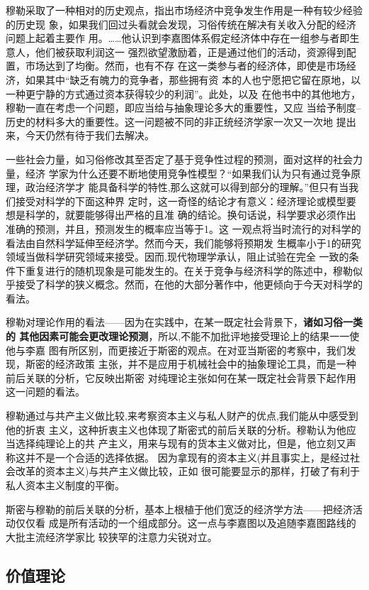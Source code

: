 穆勒采取了一种相对的历史观点，指出市场经济中竞争发生作用是一种有较少经验的历史现
象，如果我们回过头看就会发现，习俗传统在解决有关收入分配的经济问题上起着主要作
用。……他认识到李嘉图体系假定经济体中存在一组参与者即生意人，他们被获取利润这一
强烈欲望激励着，正是通过他们的活动，资源得到配置，市场达到了均衡。然而，也有不存
在这一类参与者的经济体，即使是市场经济，如果其中“缺乏有魄力的竞争者，那些拥有资
本的人也宁愿把它留在原地，以一种更宁静的方式通过资本获得较少的利润”。此处，以及
在他书中的其他地方，穆勒一直在考虑一个问题，即应当给与抽象理论多大的重要性，又应
当给予制度--历史的材料多大的重要性。这一问题被不同的非正统经济学家一次又一次地
提出来，今天仍然有待于我们去解决。

一些社会力量，如习俗修改其至否定了基于竞争性过程的预测，面对这样的社会力量，经济
学家为什么还要不断地使用竞争性模型？“如果我们认为只有通过竞争原理，政治经济学才
能具备科学的特性,那么这就可以得到部分的理解。”但只有当我们接受对科学的下面这种界
定时，这一奇怪的结论才有意义：经济理论或模型要想是科学的，就要能够得出严格的且准
确的结论。换句话说，科学要求必须作出准确的预测，并且，预测发生的概率应当等于1。这
一观点将当时流行的对科学的看法由自然科学延伸至经济学。然而今天，我们能够将预期发
生概率小于1的研究领域当做科学研究领域来接受。因而,现代物理学承认，阻止试验在完全
一致的条件下重复进行的随机现象是可能发生的。在关于竞争与经济科学的陈述中，穆勒似
乎接受了科学的狭义概念。然而，在他的大部分著作中，他更倾向于今天对科学的看法。


穆勒对理论作用的看法——因为在实践中，在某一既定社会背景下，\textbf{诸如习俗一类的
  其他因素可能会更改理论预测}，所以,不能不加批评地接受理论上的结果一一使他与李嘉
图有所区别，而更接近于斯密的观点。在对亚当斯密的考察中，我们发现，斯密的经济政策
主张，并不是应用于机械社会中的抽象理论工具，而是一种前后关联的分析，它反映出斯密
对纯理论主张如何在某一既定社会背景下起作用这一问题的看法。

穆勒通过与共产主义做比较,来考察资本主义与私人财产的优点,我们能从中感受到他的折衷
主义，这种折衷主义也体现了斯密式的前后关联的分析。穆勒认为他应当选择纯理论上的共
产主义，用来与现有的货本主义做对比，但是，他立刻又声称这并不是一个合适的选择依据。
因为拿现有的资本主义(并且事实上，是经过社会改革的资本主义)与共产主义做比较，正如
很可能要显示的那样，打破了有利于私人资本主义制度的平衡。

斯密与穆勒的前后关联的分析，基本上根植于他们宽泛的经济学方法——把经济活动仅仅看
成是所有活动的一个组成部分。这一点与李嘉图以及追随李嘉图路线的大批主流经济学家比
较狭罕的注意力尖锐对立。

\subsection{价值理论}

